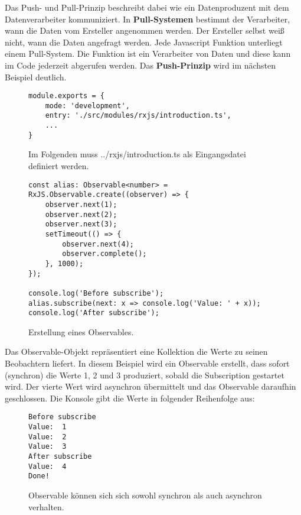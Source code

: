 \noindent
Das Push- und Pull-Prinzip beschreibt dabei wie ein Datenproduzent mit dem Datenverarbeiter kommuniziert. In \textbf{Pull-Systemen} bestimmt der Verarbeiter, wann die Daten vom Ersteller angenommen werden. Der Ersteller selbst weiß nicht, wann die Daten angefragt werden. Jede Javascript Funktion unterliegt einem Pull-System. Die Funktion ist ein Verarbeiter von Daten und diese kann im Code jederzeit abgerufen werden. Das \textbf{Push-Prinzip} wird im nächsten Beispiel deutlich. 

\begin{figure}[H]
\begin{lstlisting}[basicstyle=\small]
module.exports = {
    mode: 'development',
    entry: './src/modules/rxjs/introduction.ts',
    ...
}
\end{lstlisting}
\caption{Im Folgenden muss ../rxjs/introduction.ts als Eingangsdatei definiert werden.}
\end{figure}

\begin{figure}[H]
\begin{lstlisting}[basicstyle=\small]
const alias: Observable<number> = RxJS.Observable.create((observer) => {
    observer.next(1);
    observer.next(2);
    observer.next(3);
    setTimeout(() => {
        observer.next(4);
        observer.complete();
    }, 1000);
});

console.log('Before subscribe');
alias.subscribe(next: x => console.log('Value: ' + x));
console.log('After subscribe');
\end{lstlisting}
\caption{Erstellung eines Observables.}
\label{creation-of-observable-first-example}
\end{figure}

\noindent
Das Observable-Objekt repräsentiert eine Kollektion die Werte zu seinen Beobachtern liefert. In diesem Beispiel wird ein Observable erstellt, dass sofort (synchron) die Werte 1, 2 und 3 produziert, sobald die Subscription gestartet wird. Der vierte Wert wird asynchron übermittelt und das Observable daraufhin geschlossen. Die Konsole gibt die Werte in folgender Reihenfolge aus:

\begin{figure}[H]
\begin{lstlisting}
Before subscribe
Value:  1
Value:  2
Value:  3
After subscribe
Value:  4
Done!
\end{lstlisting}
\caption{Observable können sich sich sowohl synchron als auch asynchron verhalten.}
\end{figure}

